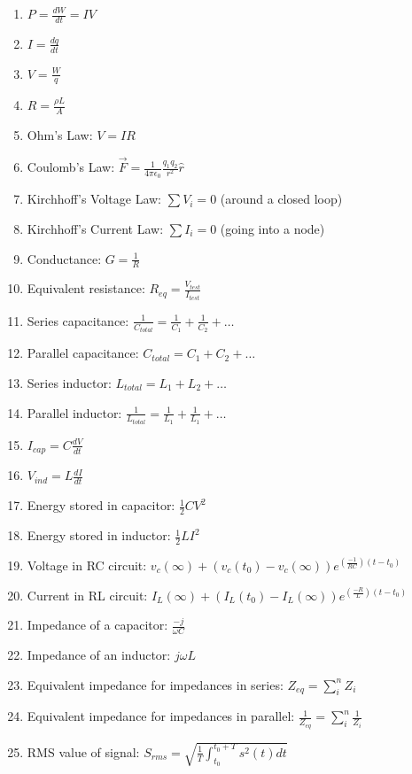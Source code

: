 \documentclass[nobib]{tufte-handout}
\begin{document}
\begin{enumerate}
    \item $P = \frac{dW}{dt} = IV$
    \item $I = \frac{dq}{dt}$
    \item $V = \frac{W}{q}$
    \item $R = \frac{\rho L}{A}$
    \item Ohm's Law: $V=IR$
    \item Coulomb's Law: $\vec{F} = \frac{1}{4\pi \epsilon_0}\frac{q_1 q_2}{r^2}\hat{r}$
    \item Kirchhoff's Voltage Law: $\sum V_i = 0$ (around a closed loop)
    \item Kirchhoff's Current Law: $\sum I_i = 0$ (going into a node)
    \item Conductance: $G = \frac{1}{R}$
    \item Equivalent resistance: $R_{eq} = \frac{V_{test}}{I_{test}}$
    \item Series capacitance: $\frac{1}{C_{total}} = \frac{1}{C_1} + \frac{1}{C_2} + \dots$
    \item Parallel capacitance: $C_{total} = C_1 + C_2 + \dots$
    \item Series inductor: $L_{total} = L_1+L_2+\dots$
    \item Parallel inductor: $\frac{1}{L_{total}} = \frac{1}{L_1} + \frac{1}{L_1} + \dots$
    \item $I_{cap} = C \frac{dV}{dt}$
    \item $V_{ind} = L \frac{dI}{dt}$
    \item Energy stored in capacitor: $\frac{1}{2}CV^2$
    \item Energy stored in inductor: $\frac{1}{2}LI^2$
    \item Voltage in RC circuit: 
    $v_c(\infty) +\left(v_c(t_0) - v_c(\infty)\right)e^{(\frac{-1}{RC})(t - t_0)}$
    \item Current in RL circuit: $I_L(\infty) +\left(I_L(t_0) - I_L(\infty)\right)e^{(\frac{-R}{L})(t - t_0)}$
    \item Impedance of a capacitor: $\frac{-j}{\omega C}$
    \item Impedance of an inductor: $j \omega L$
    \item Equivalent impedance for impedances in series: $Z_{eq} = \sum_{i}^{n} Z_i$
    \item Equivalent impedance for impedances in parallel: $\frac{1}{Z_{eq}} = \sum_{i}^{n} \frac{1}{Z_i}$
    \item RMS value of signal: $S_{rms} = \sqrt{\frac{1}{T}\int_{t_0}^{t_0+T} s^2(t) dt}$

\end{enumerate}
\end{document}
